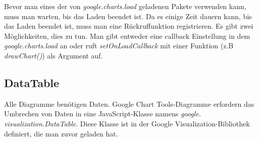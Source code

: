 Bevor man eines der von \textit{google.charts.load} geladenen Pakete verwenden kann, muss man warten, bis das Laden beendet ist. 
Da es einige Zeit dauern kann, bis das Laden beendet ist, muss man eine Rückruffunktion registrieren. Es gibt zwei Möglichkeiten, dies zu tun. Man gibt entweder eine callback Einstellung in dem \textit{google.charts.load} an oder ruft \textit{setOnLoadCallback} mit einer Funktion (z.B \textit{drawChart()}) als Argument auf.


%


 

\subsection{DataTable}
Alle Diagramme benötigen Daten. Google Chart Tools-Diagramme erfordern das Umbrechen von Daten in eine JavaScript-Klasse namens \textit{google.} \textit{visualization.DataTable}. Diese Klasse ist in der Google Visualization-Bibliothek definiert, die man zuvor geladen hat.

